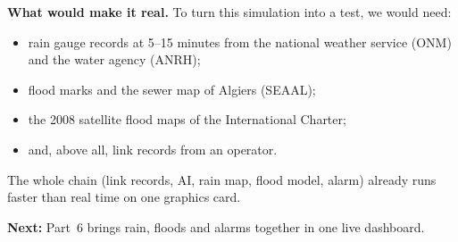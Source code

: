 \textbf{What would make it real.} To turn this simulation into a test, we would need:
\begin{itemize}
\item rain gauge records at 5--15 minutes from the national weather service (ONM) and the water agency (ANRH);
\item flood marks and the sewer map of Algiers (SEAAL);
\item the 2008 satellite flood maps of the International Charter;
\item and, above all, link records from an operator.
\end{itemize}
The whole chain (link records, AI, rain map, flood model, alarm) already runs faster than real time on one graphics card.

\textbf{Next:} Part~6 brings rain, floods and alarms together in one live dashboard.
